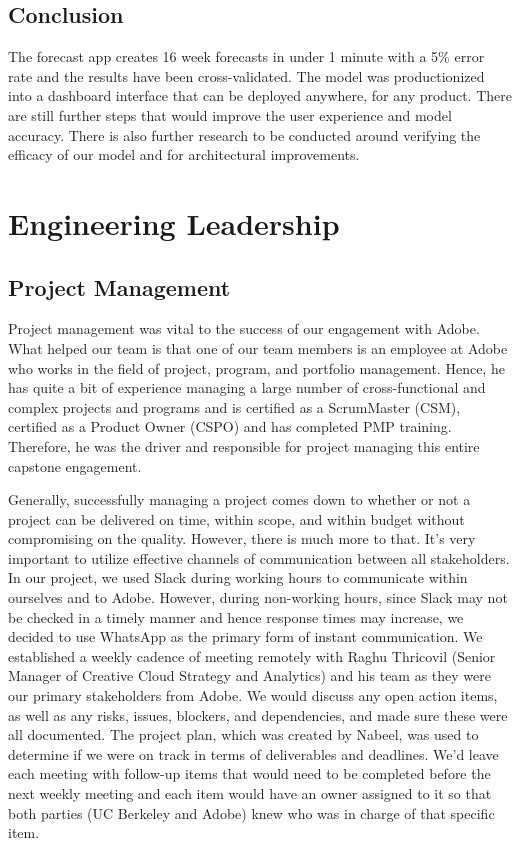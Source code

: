 \documentclass[11pt, oneside]{report}
\begin{document}
\section{Conclusion}
The forecast app creates 16 week forecasts in under 1 minute with a 5\% error rate and the results have been cross-validated. The model was productionized into a dashboard interface that can be deployed anywhere, for any product. There are still further steps that would improve the user experience and model accuracy. There is also further research to be conducted around verifying the efficacy of our model and for architectural improvements.

\chapter{Engineering Leadership}

\section{Project Management}
Project management was vital to the success of our engagement with Adobe. What helped our team is that one of our team members is an employee at Adobe who works in the field of project, program, and portfolio management. Hence, he has quite a bit of experience managing a large number of cross-functional and complex projects and programs and is certified as a ScrumMaster (CSM), certified as a Product Owner (CSPO) and has completed PMP training. Therefore, he was the driver and responsible for project managing this entire capstone engagement.

Generally, successfully managing a project comes down to whether or not a project can be delivered on time, within scope, and within budget without compromising on the quality. However, there is much more to that. It's very important to utilize effective channels of communication between all stakeholders. In our project, we used Slack during working hours to communicate within ourselves and to Adobe. However, during non-working hours, since Slack may not be checked in a timely manner and hence response times may increase, we decided to use WhatsApp as the primary form of instant communication. We established a weekly cadence of meeting remotely with Raghu Thricovil (Senior Manager of Creative Cloud Strategy and Analytics) and his team as they were our primary stakeholders from Adobe. We would discuss any open action items, as well as any risks, issues, blockers, and dependencies, and made sure these were all documented. The project plan, which was created by Nabeel, was used to determine if we were on track in terms of deliverables and deadlines. We'd leave each meeting with follow-up items that would need to be completed before the next weekly meeting and each item would have an owner assigned to it so that both parties (UC Berkeley and Adobe) knew who was in charge of that specific item.
\end{document}

